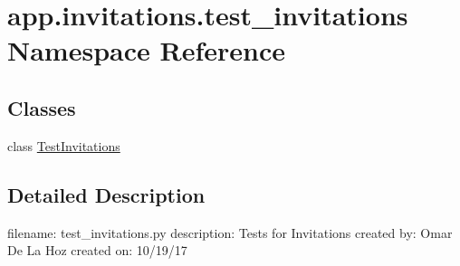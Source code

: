 \hypertarget{namespaceapp_1_1invitations_1_1test__invitations}{}\section{app.\+invitations.\+test\+\_\+invitations Namespace Reference}
\label{namespaceapp_1_1invitations_1_1test__invitations}
\subsection*{Classes}
\begin{DoxyCompactItemize}
\item 
class \mbox{\hyperlink{classapp_1_1invitations_1_1test__invitations_1_1_test_invitations}{Test\+Invitations}}
\end{DoxyCompactItemize}


\subsection{Detailed Description}
\begin{DoxyVerb}filename: test_invitations.py
description: Tests for Invitations
created by: Omar De La Hoz
created on: 10/19/17
\end{DoxyVerb}
 